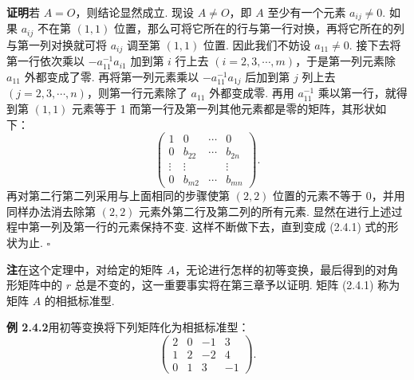\documentclass[UTF8, 12pt, fontset=fandol, oneside]{ctexart}
\begin{document}
\noindent\textbf{证明}\quad 若 $A=O$，则结论显然成立. 现设 $A\ne O$，即 $A$ 至少有一个元素 $a_{ij}\ne 0$. 如果 $a_{ij}$ 不在第 $(1,1)$ 位置，那么可将它所在的行与第一行对换，再将它所在的列与第一列对换就可将 $a_{ij}$ 调至第 $(1,1)$ 位置. 因此我们不妨设 $a_{11}\ne 0$. 接下去将第一行依次乘以 $-a_{11}^{-1}a_{i1}$ 加到第 $i$ 行上去 $(i=2,3,\cdots,m)$，于是第一列元素除 $a_{11}$ 外都变成了零. 再将第一列元素乘以 $-a_{11}^{-1}a_{1j}$ 后加到第 $j$ 列上去 $(j=2,3,\cdots,n)$，则第一行元素除了 $a_{11}$ 外都变成零. 再用 $a_{11}^{-1}$ 乘以第一行，就得到第 $(1,1)$ 元素等于 1 而第一行及第一列其他元素都是零的矩阵，其形状如下：
\[
\left(\begin{array}{cccc}
1 & 0 & \cdots & 0\\
0 & b_{22} & \cdots & b_{2n}\\
\vdots & \vdots & & \vdots\\
0 & b_{m2} & \cdots & b_{mn}
\end{array}\right).
\]
再对第二行第二列采用与上面相同的步骤使第 $(2,2)$ 位置的元素不等于 0，并用同样办法消去除第 $(2,2)$ 元素外第二行及第二列的所有元素. 显然在进行上述过程中第一列及第一行的元素保持不变. 这样不断做下去，直到变成 (2.4.1) 式的形状为止. $\square$

\noindent\textbf{注}\quad 在这个定理中，对给定的矩阵 $A$，无论进行怎样的初等变换，最后得到的对角形矩阵中的 $r$ 总是不变的，这一重要事实将在第三章予以证明. 矩阵 (2.4.1) 称为矩阵 $A$ 的相抵标准型.

\noindent\textbf{例 2.4.2}\quad 用初等变换将下列矩阵化为相抵标准型：
\[
\left(\begin{array}{cccc}
2 & 0 & -1 & 3\\
1 & 2 & -2 & 4\\
0 & 1 & 3 & -1
\end{array}\right).
\]
\end{document}
